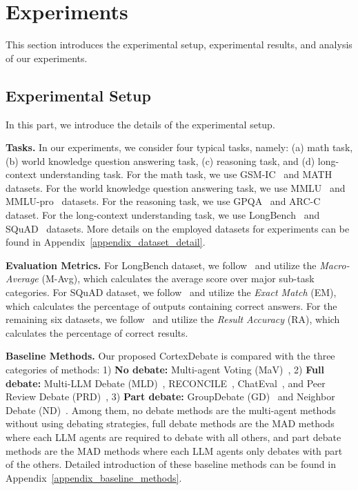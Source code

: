 \section{Experiments}
This section introduces the experimental setup, experimental results, and analysis of our experiments. 



\subsection{Experimental Setup}
\label{main_experimental_setup}
In this part, we introduce the details of the experimental setup.

\textbf{Tasks.} In our experiments, we consider four typical tasks, namely: (a) math task, (b) world knowledge question answering task, (c) reasoning task, and (d) long-context understanding task. For the math task, we use GSM-IC~\citep{shi2023large} and MATH~\citep{hendrycks2measuring} datasets. For the world knowledge question answering task, we use MMLU~\citep{hendrycksmeasuring} and MMLU-pro~\citep{wang2024mmlu} datasets. For the reasoning task, we use GPQA~\citep{rein2023gpqa} and ARC-C~\citep{clark2018think} dataset. For the long-context understanding task, we use LongBench~\citep{bai2023longbench} and SQuAD~\citep{rajpurkar2016squad} datasets. More details on the employed datasets for experiments can be found in Appendix~\ref{appendix_dataset_detail}.

\textbf{Evaluation Metrics.} For LongBench dataset, we follow~\cite{bai2023longbench} and utilize the \textit{Macro-Average} (M-Avg), which calculates the average score over major sub-task categories. For SQuAD dataset, we follow~\citep{rajpurkar2016squad} and utilize the \textit{Exact Match} (EM), which calculates the percentage of outputs containing correct answers. For the remaining six datasets, we follow~\citep{shi2023large, hendrycks2measuring, hendrycksmeasuring, wang2024mmlu, rein2023gpqa, clark2018think, sun2025fast} and utilize the \textit{Result Accuracy} (RA), which calculates the percentage of correct results.

\textbf{Baseline Methods.} Our proposed CortexDebate is compared with the three categories of methods: 1) \textbf{No debate:} Multi-agent Voting (MaV)~\citep{wangself}, 2) \textbf{Full debate:} Multi-LLM Debate (MLD)~\citep{duimproving}, RECONCILE~\citep{chen2023reconcile}, ChatEval~\citep{chanchateval}, and Peer Review Debate (PRD)~\citep{xu2023towards}, 3) \textbf{Part debate:} GroupDebate (GD)~\citep{liu2024groupdebate} and Neighbor Debate (ND)~\citep{li2024improving}. Among them, no debate methods are the multi-agent methods without using debating strategies, full debate methods are the MAD methods where each LLM agents are required to debate with all others, and part debate methods are the MAD methods where each LLM agents only debates with part of the others. Detailed introduction of these baseline methods can be found in Appendix~\ref{appendix_baseline_methods}.

